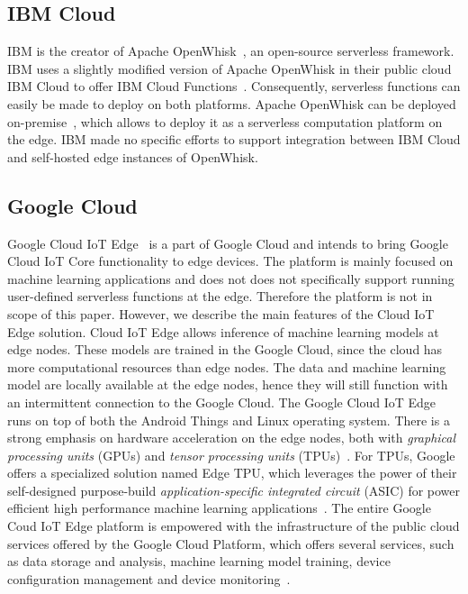 \documentclass[article]{aaltoseries}
\begin{document}
\subsection{IBM Cloud}
IBM is the creator of Apache OpenWhisk~\cite{the_apache_software_foundation_apache_nodate}, an open-source serverless framework.
IBM uses a slightly modified version of Apache OpenWhisk in their public cloud IBM Cloud to offer IBM Cloud Functions~\cite{lynn_preliminary_2017}.
Consequently, serverless functions can easily be made to deploy on both platforms.
Apache OpenWhisk can be deployed on-premise~\cite{the_apache_software_foundation_apache_nodate}, which allows to deploy it as a serverless computation platform on the edge.
IBM made no specific efforts to support integration between IBM Cloud and self-hosted edge instances of OpenWhisk.

\subsection{Google Cloud}
Google Cloud IoT Edge~\cite{google_edge_nodate} is a part of Google Cloud and intends to bring Google Cloud IoT Core functionality to edge devices.
The platform is mainly focused on machine learning applications and does not does not specifically support running user-defined serverless functions at the edge.
Therefore the platform is not in scope of this paper.
However, we describe the main features of the Cloud IoT Edge solution.
Cloud IoT Edge allows inference of machine learning models at edge nodes.
These models are trained in the Google Cloud, since the cloud has more computational resources than edge nodes.
The data and machine learning model are locally available at the edge nodes, hence they will still function with an intermittent connection to the Google Cloud. %
The Google Cloud IoT Edge runs on top of both the Android Things and Linux operating system. %
There is a strong emphasis on hardware acceleration on the edge nodes, both with \emph{graphical processing units} (GPUs) and \emph{tensor processing units} (TPUs)~\cite{google_cloud_nodate}.
For TPUs, Google offers a specialized solution named Edge TPU\texttrademark, which leverages the power of their self-designed purpose-build \emph{application-specific integrated circuit} (ASIC) for power efficient high performance machine learning applications~\cite{google_edge_nodate}.
The entire Google Coud IoT Edge platform is empowered with the infrastructure of the public cloud services offered by the Google Cloud Platform, which offers several services, such as data storage and analysis, machine learning model training, device configuration management and device monitoring~\cite{google_cloud_nodate}.
\end{document}
